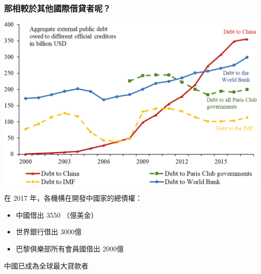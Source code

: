 \begin{frame}
    \frametitle{那相較於其他國際借貸者呢？}
        \includegraphics[width = \textwidth]{fig/fig9.jpg}
\end{frame}

\begin{frame}
    在 2017 年，各機構在開發中國家的總債權：
    \begin{itemize}
        \item 中國借出 3550 （億美金）
        \item 世界銀行借出 3000億
        \item 巴黎俱樂部所有會員國借出 2000億
    \end{itemize}

    \vfill
    中國已成為全球最大貸款者

\end{frame}


